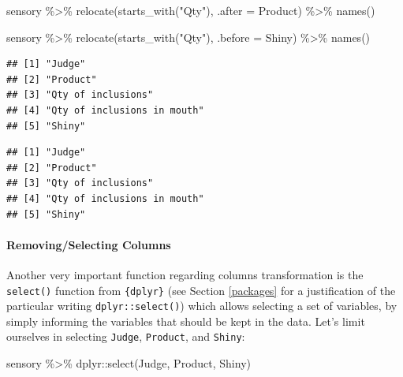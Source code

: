 \documentclass[
]{krantz}
\makeatletter
\newenvironment{Shaded}{\begin{snugshade}}{\end{snugshade}}
\newcommand{\AttributeTok}[1]{\textcolor[rgb]{0.61,0.61,0.61}{#1}}
\newcommand{\FunctionTok}[1]{\textcolor[rgb]{0,0,0}{#1}}
\newcommand{\NormalTok}[1]{#1}
\newcommand{\SpecialCharTok}[1]{\textcolor[rgb]{0,0,0}{#1}}
\newcommand{\StringTok}[1]{\textcolor[rgb]{0.5,0.5,0.5}{#1}}
\newenvironment{kframe}{%
\medskip{}
\setlength{\fboxsep}{.8em}
 \def\at@end@of@kframe{}%
 \ifinner\ifhmode%
  \def\at@end@of@kframe{\end{minipage}}%
  \begin{minipage}{\columnwidth}%
 \fi\fi%
 \def\FrameCommand##1{\hskip\@totalleftmargin \hskip-\fboxsep
 \colorbox{shadecolor}{##1}\hskip-\fboxsep
     \hskip-\linewidth \hskip-\@totalleftmargin \hskip\columnwidth}%
 \MakeFramed {\advance\hsize-\width
   \@totalleftmargin\z@ \linewidth\hsize
   \@setminipage}}%
 {\par\unskip\endMakeFramed%
 \at@end@of@kframe}
\renewenvironment{Shaded}{\begin{kframe}}{\end{kframe}}
\makeatother
\begin{document}
\begin{Shaded}
\begin{Highlighting}[]
\NormalTok{sensory }\SpecialCharTok{\%\textgreater{}\%}
  \FunctionTok{relocate}\NormalTok{(}\FunctionTok{starts\_with}\NormalTok{(}\StringTok{"Qty"}\NormalTok{), }\AttributeTok{.after =}\NormalTok{ Product) }\SpecialCharTok{\%\textgreater{}\%}
  \FunctionTok{names}\NormalTok{()}

\NormalTok{sensory }\SpecialCharTok{\%\textgreater{}\%}
  \FunctionTok{relocate}\NormalTok{(}\FunctionTok{starts\_with}\NormalTok{(}\StringTok{"Qty"}\NormalTok{), }\AttributeTok{.before =}\NormalTok{ Shiny) }\SpecialCharTok{\%\textgreater{}\%}
  \FunctionTok{names}\NormalTok{()}
\end{Highlighting}
\end{Shaded}

\begin{verbatim}
## [1] "Judge"                     
## [2] "Product"                   
## [3] "Qty of inclusions"         
## [4] "Qty of inclusions in mouth"
## [5] "Shiny"
\end{verbatim}

\begin{verbatim}
## [1] "Judge"                     
## [2] "Product"                   
## [3] "Qty of inclusions"         
## [4] "Qty of inclusions in mouth"
## [5] "Shiny"
\end{verbatim}

\hypertarget{removingselecting-columns}{%
\paragraph*{Removing/Selecting Columns}\label{removingselecting-columns}}

Another very important function regarding columns transformation is the \texttt{select()} function from \texttt{\{dplyr\}} (see Section \ref{packages} for a justification of the particular writing \texttt{dplyr::select()}) which allows selecting a set of variables, by simply informing the variables that should be kept in the data. Let's limit ourselves in selecting \texttt{Judge}, \texttt{Product}, and \texttt{Shiny}:

\begin{Shaded}
\begin{Highlighting}[]
\NormalTok{sensory }\SpecialCharTok{\%\textgreater{}\%}
\NormalTok{  dplyr}\SpecialCharTok{::}\FunctionTok{select}\NormalTok{(Judge, Product, Shiny)}
\end{Highlighting}
\end{Shaded}
\end{document}
